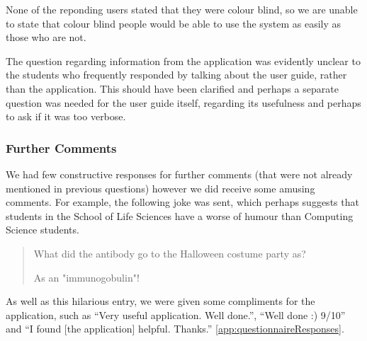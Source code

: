 None of the reponding users stated that they were colour blind, so we
are unable to state that colour blind people would be able to use the
system as easily as those who are not.

The question regarding information from the application was evidently
unclear to the students who frequently responded by talking about the
user guide, rather than the application.
This should have been clarified and perhaps a separate question was
needed for the user guide itself, regarding its usefulness and perhaps
to ask if it was too verbose.

\subsubsection{Further Comments}

We had few constructive responses for further comments (that were not
already mentioned in previous questions) however we did receive some
amusing comments.
For example, the following joke was sent, which perhaps suggests that
students in the School of Life Sciences have a worse of humour than
Computing Science students.
\begin{quote}
  What did the antibody go to the Halloween costume party as?

  As an "immunogobulin"!
\end{quote}

As well as this hilarious entry, we were given some compliments for
the application, such as ``Very useful application. Well done.'',
``Well done :) 9/10'' and ``I found [the application]
helpful. Thanks.'' \ref{app:questionnaireResponses}.



